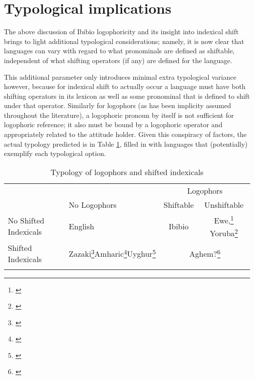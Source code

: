 \documentclass[output=paper]{langscibook}
\begin{document}
\section{Typological implications}

The above discussion of Ibibio logophoricity and its insight into indexical shift brings to light additional typological considerations; namely, it is now clear that languages can vary with regard to what pronominals are defined as shiftable, independent of what shifting operators (if any) are defined for the language.

This additional parameter only introduces minimal extra typological variance however, because for indexical shift to actually occur a language must have both shifting operators in its lexicon as well as some pronominal that is defined to shift under that operator. Similarly for logophors (as has been implicity assumed throughout the literature), a logophoric pronoun by itself is not sufficient for logophoric reference; it also must be bound by a logophoric operator and appropriately related to the attitude holder. Given this conspiracy of factors, the actual typology predicted is in Table \ref{type}, filled in with languages that (potentially) exemplify each typological option.\largerpage

\begin{table}[H]
\begin{tabularx}{\textwidth}{l>{\centering}Xcc}
          \lsptoprule
	&	&	\multicolumn{2}{c}{{Logophors}} \\\cmidrule(lr){3-4}
	&	{No Logophors}	&	{Shiftable}	&	{Unshiftable} \\ \midrule
{No Shifted Indexicals} &	English	&	Ibibio	&	Ewe,\footnote{\citet{Clements1975,Pearson2015}} Yoruba\footnote{\citet{Adesola2005}} \\
	{Shifted Indexicals}	& Zazaki\footnote{\citet{Anand2004,Anand2006}}\newline Amharic\footnote{\citet{Schlenker2003}}\newline Uyghur\footnote{\citet{Sudo2012,Shklovsky2014}}	&	\multicolumn{2}{c}{Aghem?\footnote{\citet{Hyman1979}}} \\
	\lspbottomrule
\end{tabularx}
\caption{Typology of logophors and shifted indexicals}\label{type}
\end{table}
\end{document}
